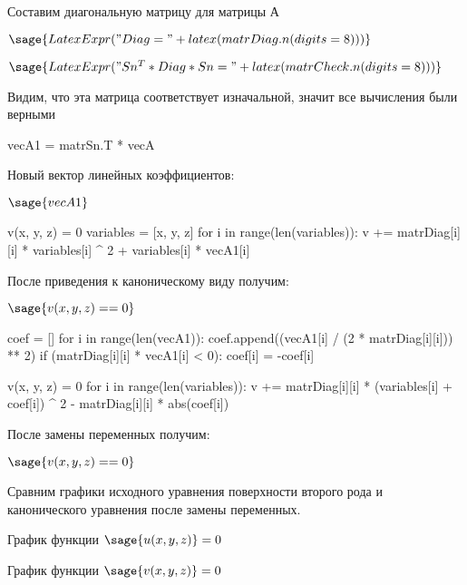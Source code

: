Составим диагональную матрицу для матрицы А

$\sage{LatexExpr("Diag = " + latex(matrDiag.n(digits = 8)))}$

$\sage{LatexExpr("Sn^T * Diag * Sn = " + latex(matrCheck.n(digits = 8)))}$

Видим, что эта матрица соответствует изначальной, значит все вычисления были верными

\begin{sagesilent}
    vecA1 = matrSn.T * vecA
\end{sagesilent}

Новый вектор линейных коэффициентов:

$\sage{vecA1}$

\begin{sagesilent}
    v(x, y, z) = 0
    variables = [x, y, z]
    for i in range(len(variables)):
        v += matrDiag[i][i] * variables[i] ^ 2 + variables[i] * vecA1[i]
\end{sagesilent}

После приведения к каноническому виду получим:

$\sage{v(x, y, z) == 0}$

\begin{sagesilent}
    coef = []
    for i in range(len(vecA1)):
        coef.append((vecA1[i] / (2 * matrDiag[i][i])) ** 2)
        if (matrDiag[i][i] * vecA1[i] < 0):
            coef[i] = -coef[i]

    v(x, y, z) = 0
    for i in range(len(variables)):
        v += matrDiag[i][i] * (variables[i] + coef[i]) ^ 2 - matrDiag[i][i] * abs(coef[i])
\end{sagesilent}

После замены переменных получим:

$\sage{v(x, y, z) == 0}$

Сравним графики исходного уравнения поверхности второго рода и канонического уравнения после замены переменных.

График функции $\sage{u(x, y, z)} = 0$
\begin{center}
\end{center}

График функции $\sage{v(x, y, z)} = 0$
\begin{center}
\end{center}